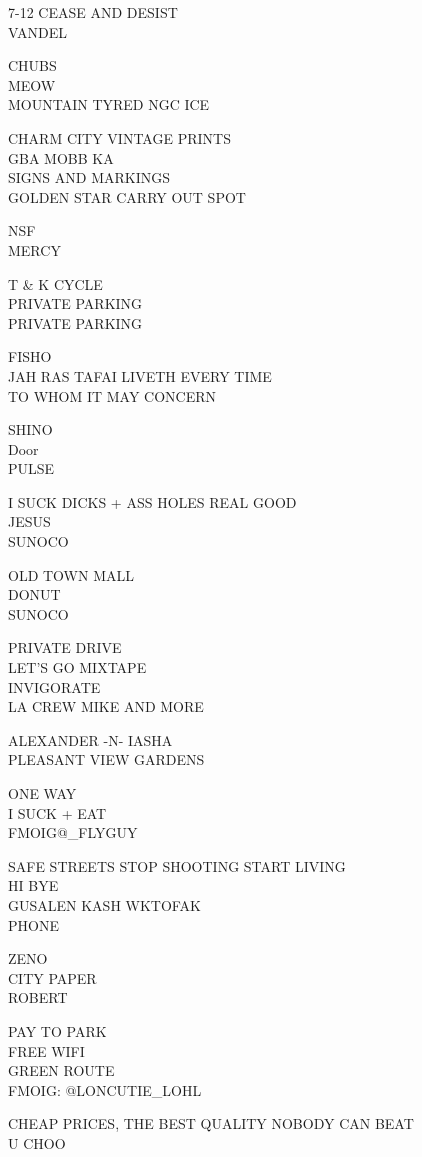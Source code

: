 \documentclass[10pt,letterpaper]{article}
\begin{document}
7{-}12 CEASE AND DESIST\\
VANDEL

CHUBS\\
MEOW\\
MOUNTAIN TYRED NGC ICE

CHARM CITY VINTAGE PRINTS\\
GBA MOBB KA\\
SIGNS AND MARKINGS\\
GOLDEN STAR CARRY OUT SPOT

NSF\\
MERCY

T \& K CYCLE\\
PRIVATE PARKING\\
PRIVATE PARKING

FISHO\\
JAH RAS TAFAI LIVETH EVERY TIME\\
TO WHOM IT MAY CONCERN

SHINO\\
Door\\
PULSE

I SUCK DICKS + ASS HOLES REAL GOOD\\
JESUS\\
SUNOCO

OLD TOWN MALL\\
DONUT\\
SUNOCO

PRIVATE DRIVE\\
LET'S GO MIXTAPE\\
INVIGORATE\\
LA CREW MIKE AND MORE

ALEXANDER {-}N{-} IASHA\\
PLEASANT VIEW GARDENS

ONE WAY\\
I SUCK + EAT\\
FMOIG@\_FLYGUY

SAFE STREETS STOP SHOOTING START LIVING\\
HI BYE\\
GUSALEN KASH WKTOFAK\\
PHONE

ZENO\\
CITY PAPER\\
ROBERT

PAY TO PARK\\
FREE WIFI\\
GREEN ROUTE\\
FMOIG: @LONCUTIE\_LOHL

CHEAP PRICES, THE BEST QUALITY NOBODY CAN BEAT\\
U CHOO
\end{document}
